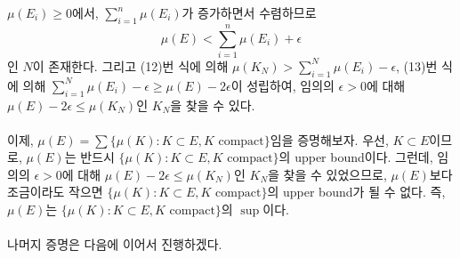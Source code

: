 \documentclass[11pt,reqno]{amsart}
\renewcommand{\(}{\left(}
\renewcommand{\)}{\right)}
\renewcommand{\[}{\left[}
\renewcommand{\]}{\right]}
\newcommand{\ep}{\epsilon}
\begin{document}
$\mu(E_i) \ge 0$에서, $\sum_{i=1}^n \mu(E_i)$가 증가하면서 수렴하므로
\begin{equation}
  \mu(E) < \sum_{i=1}^n \mu(E_i) + \ep
\end{equation}
인 $N$이 존재한다. 그리고 (12)번 식에 의해 $\mu(K_N) > \sum_{i=1}^N \mu(E_i) - \ep$, (13)번 식에 의해 
$\sum_{i=1}^N \mu(E_i) - \ep \ge \mu(E) - 2\ep$이 성립하여, 임의의 $\ep > 0$에 대해 $\mu(E) - 2\ep \le \mu(K_N)$인 
$K_N$을 찾을 수 있다. \\ \\ 
이제, $\mu(E) = \sum \{ \mu (K): K \subset E, K \text{ compact} \}$임을 증명해보자. 우선, $K \subset E$이므로, 
$\mu(E)$는 반드시 $\{ \mu(K) : K \subset E, K \text{ compact} \}$의 upper bound이다. 그런데, 임의의 $\ep > 0$에 대해 
$\mu(E) - 2\ep \le \mu(K_N)$인 $K_N$을 찾을 수 있었으므로, $\mu(E)$보다 조금이라도 작으면 
$\{ \mu (K): K \subset E, K \text{ compact} \}$의 upper bound가 될 수 없다. 즉, $\mu(E)$는 
$\{ \mu (K): K \subset E, K \text{ compact} \}$의 $\sup$이다. \\ \\ 

나머지 증명은 다음에 이어서 진행하겠다.
\end{document}
